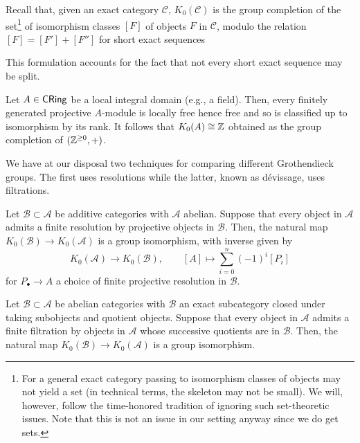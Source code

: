 \documentclass[11pt]{article}
\renewcommand{\AA}{\mathcal{A}}
\newcommand{\BB}{\mathcal{B}}
\newcommand{\CC}{\mathcal{C}}
\begin{document}
Recall that, given an exact category $\CC$, $K_0(\CC)$ is the group completion of the set\footnote{For a general exact category passing to isomorphism classes of objects may not yield a set (in technical terms, the skeleton may not be small). We will, however, follow the time-honored tradition of ignoring such set-theoretic issues. Note that this is not an issue in our setting anyway since we do get sets.} of isomorphism classes $[F]$ of objects $F$ in $\CC$, modulo the relation $[F]=[F']+[F'']$ for short exact sequences
\begin{center}
\end{center}
This formulation accounts for the fact that not every short exact sequence may be split.

\begin{example}
Let $A\in\operatorname{\mathsf{CRing}}$ be a local integral domain (e.g., a field). Then, every finitely generated projective $A$-module is locally free hence free and so is classified up to isomorphism by its rank. It follows that $K_0(A)\cong\mathbb{Z}$ obtained as the group completion of $(\mathbb{Z}^{\geq0},+)$.
\end{example}

We have at our disposal two techniques for comparing different Grothendieck groups. The first uses resolutions while the latter, known as d\'{e}vissage, uses filtrations.

\begin{lemma}
Let $\BB\subset\AA$ be additive categories with $\AA$ abelian. Suppose that every object in $\AA$ admits a finite resolution by projective objects in $\BB$. Then, the natural map $K_0(\BB)\to K_0(\AA)$ is a group isomorphism, with inverse given by 
$$K_0(\AA)\to K_0(\BB),\qquad [A]\mapsto\sum_{i=0}^n(-1)^i[P_i]$$
for $P_{\bullet}\to A$ a choice of finite projective resolution in $\BB$.
\end{lemma}

\begin{lemma}
Let $\BB\subset\AA$ be abelian categories with $\BB$ an exact subcategory closed under taking subobjects and quotient objects. Suppose that every object in $\AA$ admits a finite filtration by objects in $\AA$ whose successive quotients are in $\BB$. Then, the natural map $K_0(\BB)\to K_0(\AA)$ is a group isomorphism.
\end{lemma}
\end{document}
